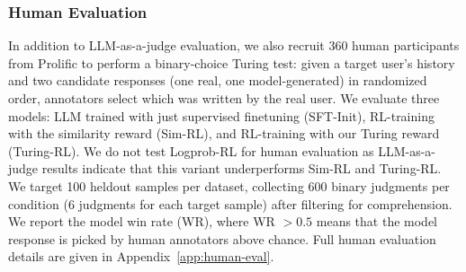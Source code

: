 \documentclass[11pt]{article}
\begin{document}
\subsubsection{Human Evaluation}

In addition to LLM-as-a-judge evaluation, we also recruit 360 human participants from Prolific to perform a binary-choice Turing test: given a target user's history and two candidate responses (one real, one model-generated) in randomized order, annotators select which was written by the real user. We evaluate three models: LLM trained with just supervised finetuning (SFT-Init), RL-training with the similarity reward (Sim-RL), and RL-training with our Turing reward (Turing-RL). We do not test Logprob-RL for human evaluation as LLM-as-a-judge results indicate that this variant underperforms Sim-RL and Turing-RL. We target 100 heldout samples per dataset, collecting 600 binary judgments per condition (6 judgments for each target sample) after filtering for comprehension. We report the model win rate (WR), where WR ${>} 0.5$ means that the model response is picked by human annotators above chance. Full human evaluation details are given in Appendix~\ref{app:human-eval}.






\end{document}

